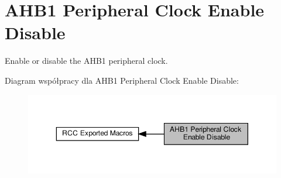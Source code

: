 \hypertarget{group___r_c_c___a_h_b1___clock___enable___disable}{}\section{A\+H\+B1 Peripheral Clock Enable Disable}
\label{group___r_c_c___a_h_b1___clock___enable___disable}


Enable or disable the A\+H\+B1 peripheral clock.  


Diagram współpracy dla A\+H\+B1 Peripheral Clock Enable Disable\+:\nopagebreak
\begin{figure}[H]
\begin{center}
\leavevmode
\includegraphics[width=350pt]{group___r_c_c___a_h_b1___clock___enable___disable}
\end{center}
\end{figure}
